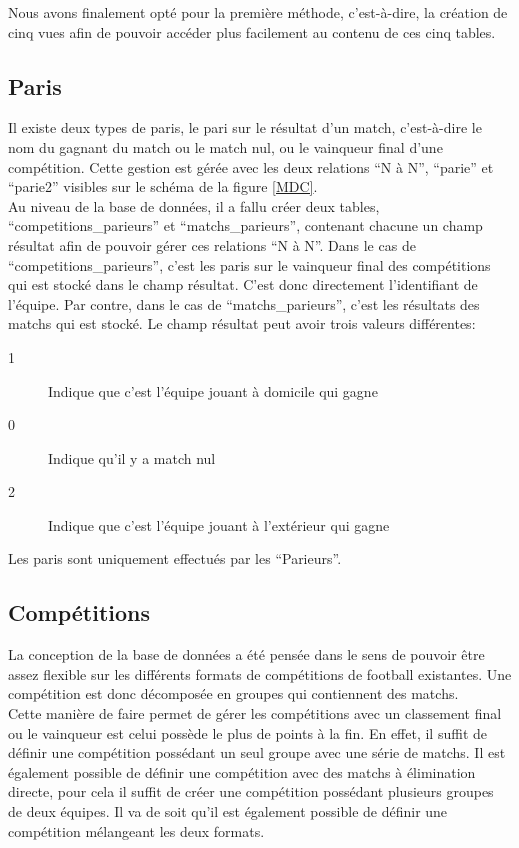 \documentclass[10pt,a4paper,titlepage]{article}
\begin{document}
Nous avons finalement opté pour la première méthode, c'est-à-dire, la création de cinq vues afin de pouvoir accéder plus facilement au contenu de ces cinq tables.

\subsection{Paris}
Il existe deux types de paris, le pari sur le résultat d'un match, c'est-à-dire le nom du gagnant du match ou le match nul, ou le vainqueur final d'une compétition. Cette gestion est gérée avec les deux relations “N à N”, “parie” et “parie2” visibles sur le schéma de la figure \ref{MDC}.\\

Au niveau de la base de données, il a fallu créer deux tables, “competitions\_parieurs” et “matchs\_parieurs”, contenant chacune un champ résultat afin de pouvoir gérer ces relations “N à N”. Dans le cas de “competitions\_parieurs”, c'est les paris sur le vainqueur final des compétitions qui est stocké dans le champ résultat. C'est donc directement l'identifiant de l'équipe. Par contre, dans le cas de “matchs\_parieurs”, c'est les résultats des matchs qui est stocké. Le champ résultat peut avoir trois valeurs différentes:
\begin{description}
	\item [1] {Indique que c'est l'équipe jouant à domicile qui gagne}
	\item [0] {Indique qu'il y a match nul}
	\item [2] {Indique que c'est l'équipe jouant à l'extérieur qui gagne\\}
\end{description}

Les paris sont uniquement effectués par les “Parieurs”.

\subsection{Compétitions}
La conception de la base de données a été pensée dans le sens de pouvoir être assez flexible sur les différents formats de compétitions de football existantes. Une compétition est donc décomposée en groupes qui contiennent des matchs.\\

Cette manière de faire permet de gérer les compétitions avec un classement final ou le vainqueur est celui possède le plus de points à la fin. En effet, il suffit de définir une compétition possédant un seul groupe avec une série de matchs. Il est également possible de définir une compétition avec des matchs à élimination directe, pour cela il suffit de créer une compétition possédant plusieurs groupes de deux équipes. Il va de soit qu'il est également possible de définir une compétition mélangeant les deux formats.
\end{document}

